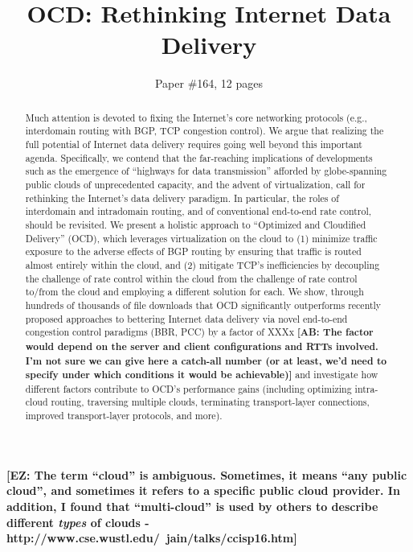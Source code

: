 \documentclass[10pt,sigconf]{acmart}
\title{OCD: Rethinking Internet Data Delivery}
\author{Paper \#164, 12 pages}
\newcommand{\mycomm}[3]{{\color{#2} \textbf{[#1: #3]}}}
\newcommand{\mycomm}[3]{}
\newcommand{\AB}[1]{\mycomm{AB}{orange}{#1}}
\newcommand{\EZ}[1]{\mycomm{EZ}{teal}{#1}}
\begin{document}
\sloppypar


\begin{abstract}
Much attention is devoted to fixing the Internet's core networking protocols
(e.g., interdomain routing with BGP, TCP congestion control). We argue that
realizing the full potential of Internet data delivery requires going well
beyond this important agenda. Specifically, we contend that the far-reaching
implications of developments such as the emergence of ``highways for data
transmission'' afforded by globe-spanning public clouds of unprecedented
capacity, and the advent of virtualization, call for rethinking the Internet's
data delivery paradigm. In particular, the roles of interdomain and intradomain
routing, and of conventional end-to-end rate control, should be revisited. We
present a holistic approach to ``Optimized and Cloudified Delivery'' (OCD),
which leverages virtualization on the cloud to (1) minimize traffic exposure to
the adverse effects of BGP routing by ensuring that traffic is routed almost
entirely within the cloud, and (2) mitigate TCP's inefficiencies by decoupling
the challenge of rate control within the cloud from the challenge of rate
control to/from the cloud and employing a different solution for each. We show,
through hundreds of thousands of file downloads that OCD significantly
outperforms recently proposed approaches to bettering Internet data delivery via
novel end-to-end congestion control paradigms (BBR, PCC) by a factor of
XXXx\AB{The factor would depend on the server and client configurations and
RTTs involved. I'm not sure we can give here a catch-all number (or at least,
we'd need to specify under which conditions it would be achievable)} and
investigate how different factors contribute to OCD's performance gains (including optimizing intra-cloud routing, traversing multiple clouds, terminating transport-layer connections, improved transport-layer protocols, and more).
\end{abstract}

\ifacmart

\maketitle
\else
\fi




\EZ{The term ``cloud'' is ambiguous. Sometimes, it means ``any public cloud'', and sometimes it refers to a specific public cloud provider. In addition, I found that ``multi-cloud'' is used by others to describe different \emph{types} of clouds - http://www.cse.wustl.edu/~jain/talks/ccisp16.htm}
\end{document}
